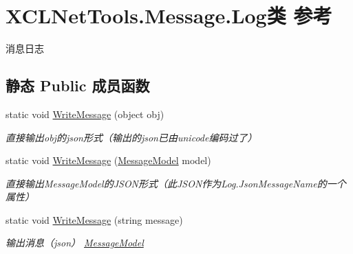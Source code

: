 \hypertarget{class_x_c_l_net_tools_1_1_message_1_1_log}{\section{X\-C\-L\-Net\-Tools.\-Message.\-Log类 参考}
\label{class_x_c_l_net_tools_1_1_message_1_1_log}
}


消息日志  


\subsection*{静态 Public 成员函数}
\begin{DoxyCompactItemize}
\item 
static void \hyperlink{class_x_c_l_net_tools_1_1_message_1_1_log_aac683d4043b6c9ac98f74d5f95dfa6f0}{Write\-Message} (object obj)
\begin{DoxyCompactList}\small\item\em 直接输出obj的json形式（输出的json已由unicode编码过了） \end{DoxyCompactList}\item 
static void \hyperlink{class_x_c_l_net_tools_1_1_message_1_1_log_a6038d85fedb63a3fe5dc306f1bf30011}{Write\-Message} (\hyperlink{class_x_c_l_net_tools_1_1_message_1_1_message_model}{Message\-Model} model)
\begin{DoxyCompactList}\small\item\em 直接输出\-Message\-Model的\-J\-S\-O\-N形式（此\-J\-S\-O\-N作为\-Log.\-Json\-Message\-Name的一个属性） \end{DoxyCompactList}\item 
static void \hyperlink{class_x_c_l_net_tools_1_1_message_1_1_log_a0f758d51c0cf8dd92645d44f1773715c}{Write\-Message} (string message)
\begin{DoxyCompactList}\small\item\em 输出消息（json） \hyperlink{class_x_c_l_net_tools_1_1_message_1_1_message_model}{Message\-Model} \end{DoxyCompactList}\end{DoxyCompactItemize}
